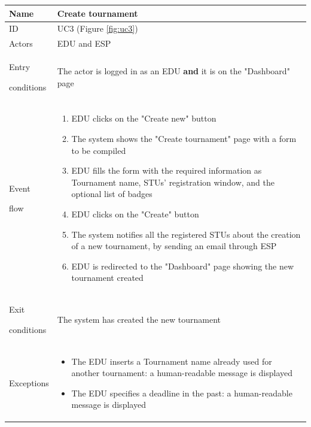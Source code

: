 \begin{center}
    \def\arraystretch{1.5}
    \begin{tabular}{| m{2cm} | m{10cm}|}
        \hline
        Name                  & Create tournament                                                                                                                    \\ \hline
        ID                    & UC3 (Figure \ref{fig:uc3})                                                                                                           \\ \hline
        Actors                & EDU and ESP                                                                                                                          \\ \hline
        Entry \par conditions & The actor is logged in as an EDU \textbf{and} it is on the "Dashboard" page                                                          \\ \hline
        Event \par flow       & \begin{enumerate}
                                    \item EDU clicks on the "Create new" button
                                    \item The system shows the "Create tournament" page with a form to be compiled
                                    \item EDU fills the form with the required information as Tournament name, STUs' registration window, and the optional list of badges
                                    \item EDU clicks on the "Create" button
                                    \item The system notifies all the registered STUs about the creation of a new tournament, by sending an email through ESP
                                    \item EDU is redirected to the "Dashboard" page showing the new tournament created
                                \end{enumerate} \\ \hline
        Exit \par conditions  & The system has created the new tournament                                                                                            \\ \hline
        Exceptions            & \begin{itemize}
                                    \item The EDU inserts a Tournament name already used for another tournament: a human-readable message is displayed
                                    \item The EDU specifies a deadline in the past: a human-readable message is displayed
                                \end{itemize}                    \\ \hline
    \end{tabular}
\end{center}

